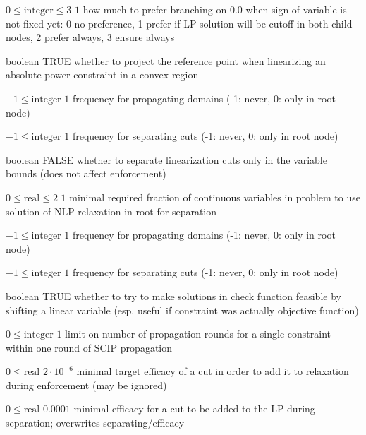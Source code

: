 %
{$0\leq\textrm{integer}\leq3$}%
{$1$}%
{how much to prefer branching on 0.0 when sign of variable is not fixed yet: 0 no preference, 1 prefer if LP solution will be cutoff in both child nodes, 2 prefer always, 3 ensure always}%
{}

%
{boolean}%
{TRUE}%
{whether to project the reference point when linearizing an absolute power constraint in a convex region}%
{}

%
{$-1\leq\textrm{integer}$}%
{$1$}%
{frequency for propagating domains (-1: never, 0: only in root node)}%
{}

%
{$-1\leq\textrm{integer}$}%
{$1$}%
{frequency for separating cuts (-1: never, 0: only in root node)}%
{}

%
{boolean}%
{FALSE}%
{whether to separate linearization cuts only in the variable bounds (does not affect enforcement)}%
{}

%
{$0\leq\textrm{real}\leq2$}%
{$1$}%
{minimal required fraction of continuous variables in problem to use solution of NLP relaxation in root for separation}%
{}

%
{$-1\leq\textrm{integer}$}%
{$1$}%
{frequency for propagating domains (-1: never, 0: only in root node)}%
{}

%
{$-1\leq\textrm{integer}$}%
{$1$}%
{frequency for separating cuts (-1: never, 0: only in root node)}%
{}

%
{boolean}%
{TRUE}%
{whether to try to make solutions in check function feasible by shifting a linear variable (esp. useful if constraint was actually objective function)}%
{}

%
{$0\leq\textrm{integer}$}%
{$1$}%
{limit on number of propagation rounds for a single constraint within one round of SCIP propagation}%
{}

%
{$0\leq\textrm{real}$}%
{$2 \cdot 10^{- 6}$}%
{minimal target efficacy of a cut in order to add it to relaxation during enforcement (may be ignored)}%
{}

%
{$0\leq\textrm{real}$}%
{$0.0001$}%
{minimal efficacy for a cut to be added to the LP during separation; overwrites separating/efficacy}%
{}

